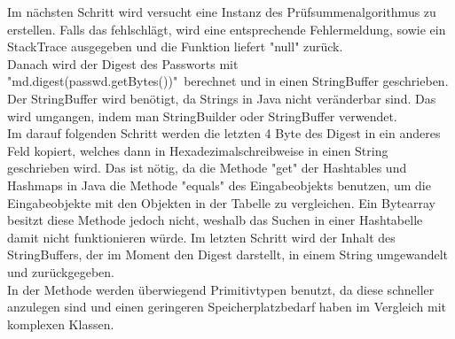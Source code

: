 \documentclass[11pt]{article}
\begin{document}
Im nächsten Schritt wird versucht eine Instanz des Prüfsummenalgorithmus zu erstellen. Falls das fehlschlägt, wird eine entsprechende Fehlermeldung, sowie ein StackTrace ausgegeben und die Funktion liefert "null" zurück.\\
Danach wird der Digest des Passworts mit "md.digest(passwd.getBytes())"\ berechnet und in einen StringBuffer geschrieben. Der StringBuffer wird benötigt, da Strings in Java nicht veränderbar sind. Das wird umgangen, indem man StringBuilder oder StringBuffer verwendet. \\
Im darauf folgenden Schritt werden die letzten 4 Byte des Digest in ein anderes Feld kopiert, welches dann in Hexadezimalschreibweise in einen String geschrieben wird. Das ist nötig, da die Methode "get" der Hashtables und Hashmaps in Java die Methode "equals" des Eingabeobjekts benutzen, um die Eingabeobjekte mit den Objekten in der Tabelle zu vergleichen. Ein Bytearray besitzt diese Methode jedoch nicht, weshalb das Suchen in einer Hashtabelle damit nicht funktionieren würde.
Im letzten Schritt wird der Inhalt des StringBuffers, der im Moment den Digest darstellt, in einem String umgewandelt und zurückgegeben.\\
In der Methode werden überwiegend Primitivtypen benutzt, da diese schneller anzulegen sind und einen geringeren Speicherplatzbedarf haben im Vergleich mit komplexen Klassen.
\end{document}
